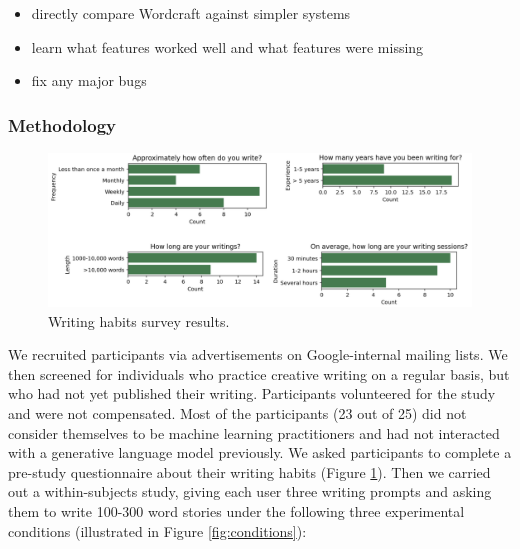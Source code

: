 \begin{itemize}
  \item directly compare Wordcraft against simpler systems
  \item learn what features worked well and what features were missing
  \item fix any major bugs
\end{itemize}

\subsubsection{Methodology} 

\begin{figure}[t]
  \centering
  \includegraphics[width=\linewidth]{figures/recruitment_survey.png}
  \caption{Writing habits survey results.}
  \label{fig:writing_habits}
\end{figure}

\noindent We recruited participants via advertisements on Google-internal mailing lists. We then screened for individuals who practice creative writing on a regular basis, but who had not yet published their writing. 
Participants volunteered for the study and were not compensated. 
Most of the participants (23 out of 25) did not consider themselves to be machine learning practitioners and had not interacted with a generative language model previously.
We asked participants to complete a pre-study questionnaire about their writing habits (Figure \ref{fig:writing_habits}).
Then we carried out a within-subjects study, giving each user three writing prompts and asking them to write 100-300 word stories under the following three experimental conditions (illustrated in Figure \ref{fig:conditions}):

